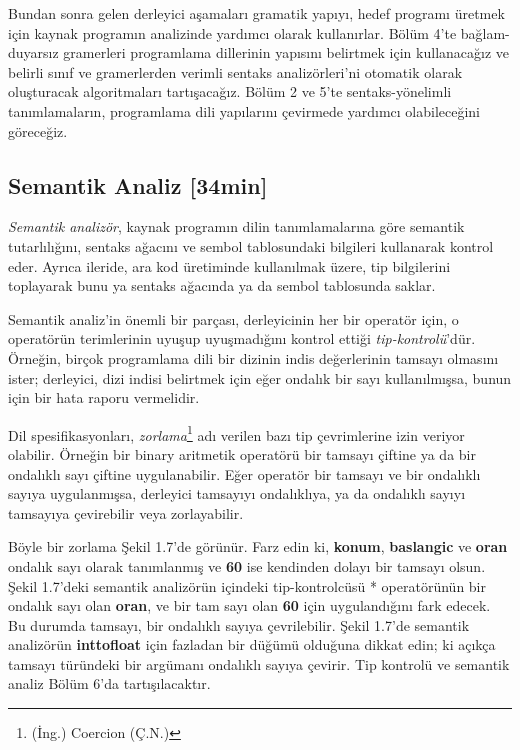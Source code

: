 Bundan sonra gelen derleyici aşamaları gramatik yapıyı, hedef programı üretmek için kaynak programın analizinde yardımcı olarak kullanırlar. Bölüm 4'te bağlam-duyarsız gramerleri programlama dillerinin yapısını belirtmek için kullanacağız ve belirli sınıf ve gramerlerden verimli sentaks analizörleri'ni otomatik olarak oluşturacak algoritmaları tartışacağız. Bölüm 2 ve 5'te sentaks-yönelimli tanımlamaların, programlama dili yapılarını çevirmede yardımcı olabileceğini göreceğiz.

\subsection{Semantik Analiz [34min]}
\textit{Semantik analizör}, kaynak programın dilin tanımlamalarına göre semantik tutarlılığını, sentaks ağacını ve sembol tablosundaki bilgileri kullanarak kontrol eder. Ayrıca ileride, ara kod üretiminde kullanılmak üzere, tip bilgilerini toplayarak bunu ya sentaks ağacında ya da sembol tablosunda saklar.

Semantik analiz'in önemli bir parçası, derleyicinin her bir operatör için, o operatörün terimlerinin uyuşup uyuşmadığını kontrol ettiği \textit{tip-kontrolü}'dür. Örneğin, birçok programlama dili bir dizinin indis değerlerinin tamsayı olmasını ister; derleyici, dizi indisi belirtmek için eğer ondalık bir sayı kullanılmışsa, bunun için bir hata raporu vermelidir.

Dil spesifikasyonları, \textit{zorlama}\footnote{(İng.) Coercion (Ç.N.)} adı verilen bazı tip çevrimlerine izin veriyor olabilir. Örneğin bir binary aritmetik operatörü bir tamsayı çiftine ya da bir ondalıklı sayı çiftine uygulanabilir. Eğer operatör bir tamsayı ve bir ondalıklı sayıya uygulanmışsa, derleyici tamsayıyı ondalıklıya, ya da ondalıklı sayıyı tamsayıya çevirebilir veya zorlayabilir.

Böyle bir zorlama Şekil 1.7'de görünür. Farz edin ki, \textbf{konum}, \textbf{baslangic} ve \textbf{oran} ondalık sayı olarak tanımlanmış ve \textbf{60} ise kendinden dolayı bir tamsayı olsun. Şekil 1.7'deki semantik analizörün içindeki tip-kontrolcüsü * operatörünün bir ondalık sayı olan \textbf{oran}, ve bir tam sayı olan \textbf{60} için uygulandığını fark edecek. Bu durumda tamsayı, bir ondalıklı sayıya çevrilebilir. Şekil 1.7'de semantik analizörün \textbf{inttofloat} için fazladan bir düğümü olduğuna dikkat edin; ki açıkça tamsayı türündeki bir argümanı ondalıklı sayıya çevirir. Tip kontrolü ve semantik analiz Bölüm 6'da tartışılacaktır.

